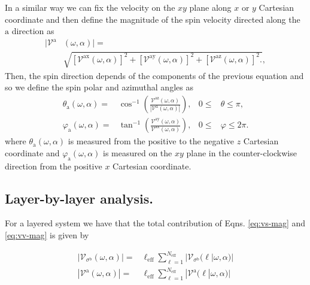 \documentclass[prb,11pt,tightenlines,twocolumn,aps]{revtex4-1}
\begin{document}
In a similar way we can fix the velocity on the $xy$ plane along $x$ or $y$
Cartesian coordinate and then define the magnitude of the spin velocity directed
along the $\mathrm{a}$ direction as
\begin{align}
|\mathcal{V}^{\mathrm{a}}&(\omega,\alpha)| = \nonumber \\
&\sqrt { 
[\mathcal{V}^{\mathrm{ax}}(\omega,\alpha)]^{2} +
[\mathcal{V}^{\mathrm{ay}}(\omega,\alpha)]^{2} +
[\mathcal{V}^{\mathrm{az}}(\omega,\alpha)]^{2} .
},
\label{eq:vv-mag}
\end{align}
Then, the spin direction depends of the components of the previous equation and
so we define the spin polar and azimuthal angles as
\begin{align}
\theta_{\mathrm{a}}  (\omega,\alpha)
=& 
\cos^{-1} \left( \frac{\mathcal{V}^{\mathrm{az}}(\omega,\alpha)}
{|\mathcal{V}^{\mathrm{a}}(\omega,\alpha)|} \right),
& 0 \leq &\theta \leq \pi, 
\label{eq:polar-ang}
\\
\varphi_{\mathrm{a}} (\omega,\alpha)
=& 
\tan^{-1} \left( \frac{\mathcal{V}^{\mathrm{ay}}(\omega,\alpha)}
{\mathcal{V}^{\mathrm{ax}}(\omega,\alpha)} \right),
& 0 \leq &\varphi \leq 2\pi.
\label{eq:azimuthal-ang} 
\end{align}
where $\theta_{\mathrm{a}}(\omega,\alpha)$ is measured from the positive to the
negative $z$ Cartesian coordinate and $\varphi_{\mathrm{a}}(\omega,\alpha)$ is
measured on the $xy$ plane in the counter-clockwise direction from the positive
$x$ Cartesian coordinate.




\subsection{Layer-by-layer analysis.}\label{sec:theory-layer}

For a layered system we have that the total contribution of Eqns. 
\eqref{eq:vs-mag} and \eqref{eq:vv-mag} is given \cite{arzatePRB14} by 

\begin{align}
|\mathcal{V}_{\sigma^{\mathrm{b}}}(\omega,\alpha)|
=& 
\ell_{\mathrm{eff}}
\sum_{\ell=1}^{N_{\mathrm{eff}}}
|\mathcal{V}_{\sigma^{\mathrm{b}}} (\ell | \omega,\alpha)|
\label{eq:vs-layer}
\\
|\mathcal{V}^{\mathrm{a}}(\omega,\alpha)|
=&
\ell_{\mathrm{eff}}
\sum_{\ell=1}^{N_{\mathrm{eff}}}
|\mathcal{V}^{\mathrm{a}} (\ell | \omega,\alpha)|
\label{eq:vv-layer}
\end{align}
\end{document}
